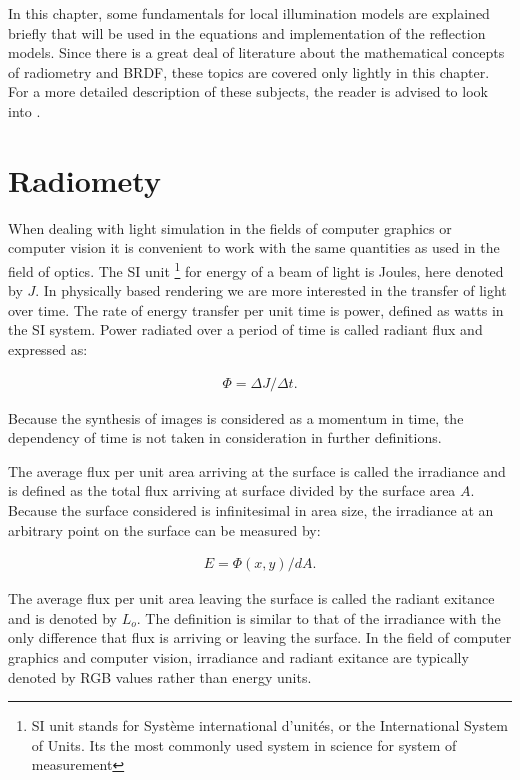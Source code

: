 \hypertarget{Fundamentals}{
}

In this chapter, some fundamentals for local illumination models are explained briefly that will be used in the equations and implementation of the reflection models. Since there is a great deal of literature about the mathematical concepts of radiometry and BRDF, these topics are covered only lightly in this chapter. For a more detailed description of these subjects, the reader is advised to look into \cite{RTR} \cite{GlobalIllumination} \cite{DigitalModeling}.

\section{Radiomety}\label{sec:Radiometry}

When dealing with light simulation in the fields of computer graphics or computer vision it is convenient to work with the same quantities as used in the field of optics. The SI unit \footnote[1]{SI unit stands for Système international d'unités, or the International System of Units. Its the most commonly used system in science for system of measurement} for energy of a beam of light is Joules, here denoted by $J$. In physically based rendering we are more interested in the transfer of light over time. The rate of energy transfer per unit time is power, defined as watts in the SI system. Power radiated over a period of time is called radiant flux and expressed as: 

		\begin{eqnarray*}
			\Phi = \Delta J / \Delta t. 
		\end{eqnarray*}

Because the synthesis of images is considered as a momentum in time, the dependency of time is not taken in consideration in further definitions.

The average flux per unit area arriving at the surface is called the irradiance and is defined as the total flux arriving at surface divided by the surface area $A$. Because the surface considered is infinitesimal in area size, the irradiance at an arbitrary point on the surface can be measured by:

		\begin{eqnarray*}
			E = \Phi(x,y) / dA. 
		\end{eqnarray*}

The average flux per unit area leaving the surface is called the radiant exitance and is denoted by $L_o$. The definition is similar to that of the irradiance with the only difference that flux is arriving or leaving the surface. In the field of computer graphics and computer vision, irradiance and radiant exitance are typically denoted by RGB values rather than energy units.


